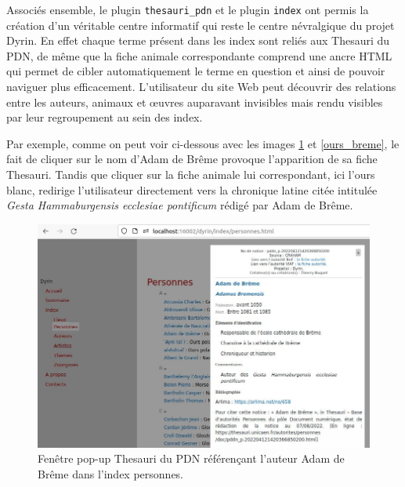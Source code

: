 \documentclass[a4paper,12pt,twoside]{book}
\begin{document}
Associés ensemble, le plugin \texttt{thesauri\_pdn} et le plugin \texttt{index} ont permis la création d'un véritable centre informatif qui reste le centre névralgique du projet Dyrin. En effet chaque terme présent dans les index sont reliés aux Thesauri du \acrshort{PDN}, de même que la fiche animale correspondante comprend une ancre \acrshort{HTML} qui permet de cibler automatiquement le terme en question et ainsi de pouvoir naviguer plus efficacement. L'utilisateur du site Web peut découvrir des relations entre les auteurs, animaux et \oe{}uvres auparavant invisibles mais rendu visibles par leur regroupement au sein des index.

Par exemple, comme on peut voir ci-dessous avec les images \ref{breme_index} et \ref{ours_breme}, le fait de cliquer sur le nom d'Adam de Brême provoque l'apparition de sa fiche Thesauri. Tandis que cliquer sur la fiche animale lui correspondant, ici l'ours blanc, redirige l'utilisateur directement vers la chronique latine citée intitulée \textit{Gesta Hammaburgensis ecclesiae pontificum} rédigé par Adam de Brême.

\begin{figure}[H]
    \centering
    \includegraphics[width=\linewidth]{img/partie_3/adam_breme.JPG}
    \caption{Fenêtre pop-up Thesauri du \acrshort{PDN} référençant l'auteur Adam de Brême dans l'index personnes.}
    \label{breme_index}
\end{figure}
\end{document}
